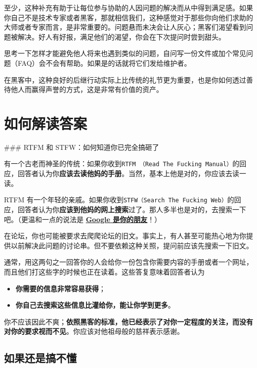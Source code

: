 \documentclass[titlepage]{article}
\begin{document}
至少，这种补充有助于让每位参与协助的人因问题的解决而从中得到满足感。如果你自己不是技术专家或者黑客，那就相信我们，这种感觉对于那些你向他们求助的大师或者专家而言，是非常重要的。问题悬而未决会让人灰心；黑客们渴望看到问题被解决。好人有好报，满足他们的渴望，你会在下次提问时尝到甜头。

思考一下怎样才能避免他人将来也遇到类似的问题，自问写一份文件或加个常见问题（FAQ）会不会有帮助。如果是的话就将它们发给维护者。

在黑客中，这种良好的后继行动实际上比传统的礼节更为重要，也是你如何透过善待他人而赢得声誉的方式，这是非常有价值的资产。

\hypertarget{ux5982ux4f55ux89e3ux8bfbux7b54ux6848}{\section{如何解读答案}\label{ux5982ux4f55ux89e3ux8bfbux7b54ux6848}}

 \#\#\# RTFM 和 STFW：如何知道你已完全搞砸了

有一个古老而神圣的传统：如果你收到\texttt{RTFM\ （Read\ The\ Fucking\ Manual）}的回应，回答者认为你\textbf{应该去读他妈的手册}。当然，基本上他是对的，你应该去读一读。

RTFM
有一个年轻的亲戚。如果你收到\texttt{STFW（Search\ The\ Fucking\ Web）}的回应，回答者认为你\textbf{应该到他妈的网上搜索}过了。那人多半也是对的，去搜索一下吧。（更温和一点的说法是
\textbf{\href{http://lmgtfy.com/}{Google 是你的朋友}}！）

在论坛，你也可能被要求去爬爬论坛的旧文。事实上，有人甚至可能热心地为你提供以前解决此问题的讨论串。但不要依赖这种关照，提问前应该先搜索一下旧文。

通常，用这两句之一回答你的人会给你一份包含你需要内容的手册或者一个网址，而且他们打这些字的时候也正在读着。这些答复意味着回答者认为

\begin{itemize}

\item
  \textbf{你需要的信息非常容易获得}；
\item
  \textbf{你自己去搜索这些信息比灌给你，能让你学到更多}。
\end{itemize}

你不应该因此不爽；\textbf{依照黑客的标准，他已经表示了对你一定程度的关注，而没有对你的要求视而不见}。你应该对他祖母般的慈祥表示感谢。

\hypertarget{ux5982ux679cux8fd8ux662fux641eux4e0dux61c2}{\subsection{如果还是搞不懂}\label{ux5982ux679cux8fd8ux662fux641eux4e0dux61c2}}
\end{document}
